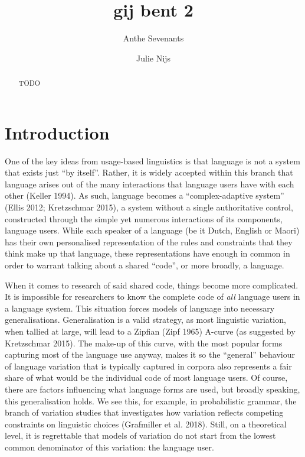 \documentclass[
  letterpaper,
  DIV=11,
  numbers=noendperiod,
  oneside]{scrartcl}
\title{gij bent 2}
\author{Anthe Sevenants \and Julie Nijs}
\date{}
\renewcommand*\contentsname{Table of contents}
\newcommand\contentsname{Table of contents}
\begin{document}
\maketitle
\begin{abstract}
TODO
\end{abstract}

\renewcommand*\contentsname{Table of contents}
{
\hypersetup{linkcolor=}
\setcounter{tocdepth}{4}
\tableofcontents
}

\section{Introduction}\label{sec-introduction}

One of the key ideas from usage-based linguistics is that language is
not a system that exists just ``by itself''. Rather, it is widely
accepted within this branch that language arises out of the many
interactions that language users have with each other (Keller 1994). As
such, language becomes a ``complex-adaptive system'' (Ellis 2012;
Kretzschmar 2015), a system without a single authoritative control,
constructed through the simple yet numerous interactions of its
components, language users. While each speaker of a language (be it
Dutch, English or Maori) has their own personalised representation of
the rules and constraints that they think make up that language, these
representations have enough in common in order to warrant talking about
a shared ``code'', or more broadly, a language.

When it comes to research of said shared code, things become more
complicated. It is impossible for researchers to know the complete code
of \emph{all} language users in a language system. This situation forces
models of language into necessary generalisations. Generalisation is a
valid strategy, as most linguistic variation, when tallied at large,
will lead to a Zipfian (Zipf 1965) A-curve (as suggested by Kretzschmar
2015). The make-up of this curve, with the most popular forms capturing
most of the language use anyway, makes it so the ``general'' behaviour
of language variation that is typically captured in corpora also
represents a fair share of what would be the individual code of most
language users. Of course, there are factors influencing what language
forms are used, but
broadly speaking, this generalisation holds. We see this, for example,
in probabilistic grammar, the branch of variation studies that
investigates how variation reflects competing constraints on linguistic
choices (Grafmiller et al. 2018). Still, on a theoretical level, it is
regrettable that models of variation do not start from the lowest common
denominator of this variation: the language user.
\end{document}
